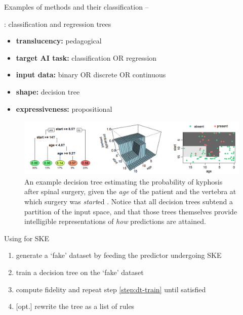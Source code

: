 \documentclass[presentation]{beamer}\mode<presentation>{\usetheme{AMSBolognaFC}}
\begin{document}
\begin{frame}[allowframebreaks]{Examples of methods and their classification -- \cart}
    \begin{block}{\textbf{\cart}: classification and regression trees}
        \begin{itemize}
            \item \textbf{translucency:} pedagogical
            \item \textbf{target AI task:} classification OR regression
            \item \textbf{input data:} binary OR discrete OR continuous
            \item \textbf{shape:} decision tree
            \item \textbf{expressiveness:} propositional
        \end{itemize}
    \end{block}

    \framebreak

    \begin{figure}
        \centering
        \includegraphics[width=\linewidth]{figures/dt-kyphosis.png}
        \caption{An example decision tree estimating the probability of kyphosis after spinal surgery, given the \emph{age} of the patient and the vertebra at which surgery was \emph{start}ed \cite{wiki:dt-learning}. Notice that all decision trees subtend a partition of the input space, and that those trees themselves provide intelligible representations of \emph{how} predictions are attained.}
        \label{fig:dt-example}
    \end{figure}

    \framebreak

    \begin{exampleblock}{Using \cart{} for SKE}
        \begin{enumerate}
            \item \alert{generate} a `fake' dataset by feeding the predictor undergoing SKE
            \item\label{step:dt-train} \alert{train} a decision tree on the `fake' dataset
            \item compute \alert{fidelity} and \alert{repeat} step \ref{step:dt-train} until satisfied
            \item \alert{[opt.]} rewrite the tree as a \alert{list of rules}
        \end{enumerate}
    \end{exampleblock}

\end{frame}
\end{document}
